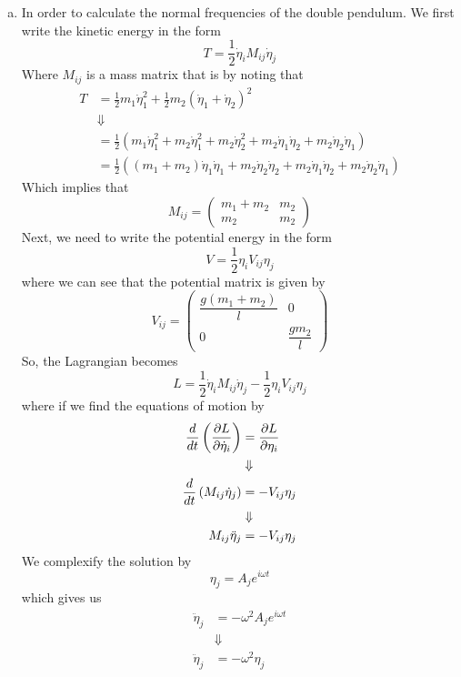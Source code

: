 \documentclass[11pt]{article}
\numberwithin{equation}{section}
\begin{document}
\begin{enumerate}[(a)]
\item In order to calculate the normal frequencies of the double pendulum. We first write the
kinetic energy in the form
$$T = \frac{1}{2}\dot{\eta}_{i}M_{ij}\dot{\eta}_{j}$$
Where $M_{ij}$ is a mass matrix that is by noting that
\begin{align*}
T &= \frac{1}{2}m_1\dot{\eta}_1^2 + \frac{1}{2}m_2\left(\dot{\eta}_1+\dot{\eta}_2\right)^2\\
&\Downarrow\\
&= \frac{1}{2}\left(m_1\dot{\eta}_1^2 + m_2\dot{\eta}_1^2 + m_2\dot{\eta}_2^2 + m_2\dot{\eta}_1\dot{\eta}_2 + m_2\dot{\eta}_2\dot{\eta}_1\right)\\
&= \frac{1}{2}\left((m_1+m_2)\dot{\eta}_1\dot{\eta}_1 + m_2\dot{\eta}_2\dot{\eta}_2 + m_2\dot{\eta}_1\dot{\eta}_2 + m_2\dot{\eta}_2\dot{\eta}_1\right)
\end{align*}
Which implies that
$$M_{ij} = \left(\begin{array}{cc}
                m_1+m_2          &m_2\\
                m_2              &m_2
           \end{array}\right)$$
Next, we need to write the potential energy in the form
$$V = \frac{1}{2}\eta_iV_{ij}\eta_j$$
where we can see that the potential matrix is given by
$$V_{ij} = \left(\begin{array}{cc}
                \dfrac{g(m_1+m_2)}{l}        &0\\
                0              &\dfrac{gm_2}{l}
           \end{array}\right)$$
So, the Lagrangian becomes
$$L = \frac{1}{2}\dot{\eta}_{i}M_{ij}\dot{\eta}_{j} - \frac{1}{2}\eta_iV_{ij}\eta_j$$
where if we find the equations of motion by
\begin{align*}
\frac{d}{dt}\left(\frac{\partial{L}}{\partial{\dot{\eta}_i}}\right) &= \frac{\partial{L}}{\partial{\eta_i}}\\
&\Downarrow\\
\frac{d}{dt}\left(M_{ij}\dot{\eta}_{j}\right) &= -V_{ij}\eta_{j}\\
&\Downarrow\\
M_{ij}\ddot{\eta}_{j} &= -V_{ij}\eta_{j}
\end{align*}
We complexify the solution by 
$$\eta_{j} = A_je^{i\omega{t}}$$
which gives us 
\begin{align*}
\ddot{\eta}_{j} &= -\omega^2A_je^{i\omega{t}}\\
&\Downarrow\\
\ddot{\eta}_{j} &= -\omega^2\eta_{j}
\end{align*}

\end{enumerate}
\end{document}
